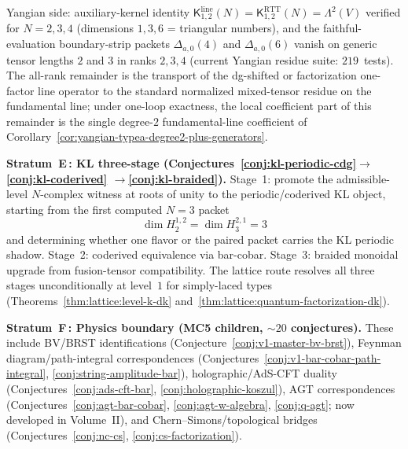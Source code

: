 \begin{remark}
Yangian side: auxiliary-kernel identity
$\mathsf{K}^{\mathrm{line}}_{1,2}(N)
= \mathsf{K}^{\mathrm{RTT}}_{1,2}(N) = \Lambda^2(V)$ verified
for $N = 2, 3, 4$ (dimensions $1, 3, 6$ = triangular numbers), and the
faithful-evaluation boundary-strip packets $\Delta_{a,0}(4)$ and
$\Delta_{a,0}(6)$ vanish on generic tensor lengths $2$ and $3$ in
ranks $2,3,4$ \textup{(}current Yangian residue suite:
$219$~tests\textup{)}. The all-rank remainder is the
transport of the dg-shifted or factorization one-factor line operator
to the standard normalized mixed-tensor residue on the fundamental
line; under one-loop exactness, the local coefficient part of this
remainder is the single degree-$2$ fundamental-line coefficient of
Corollary~\textup{\ref{cor:yangian-typea-degree2-plus-generators}}.

\smallskip\noindent
\textbf{Stratum~E\,: KL three-stage
(Conjectures~\ref{conj:kl-periodic-cdg}$\to$\ref{conj:kl-coderived}%
$\to$\ref{conj:kl-braided}).}
Stage~1: promote the admissible-level $N$-complex witness at roots
of unity to the periodic/coderived KL object, starting from the first
computed $N=3$ packet
\[
\dim H^{1,2}_2
=
\dim H^{2,1}_3
=
3
\]
and determining whether one flavor or the paired packet carries the KL
periodic shadow.
Stage~2: coderived equivalence via bar-cobar.
Stage~3: braided monoidal upgrade from fusion-tensor compatibility.
The lattice route resolves all three stages unconditionally at
level~$1$ for simply-laced types
\textup{(}Theorems~\ref{thm:lattice:level-k-dk}
and~\ref{thm:lattice:quantum-factorization-dk}\textup{)}.

\smallskip\noindent
\textbf{Stratum~F\,: Physics boundary \textup{(}MC5 children, ${\sim}20$
conjectures\textup{)}.}
These include BV/BRST identifications
\textup{(}Conjecture~\ref{conj:v1-master-bv-brst}\textup{)},
Feynman diagram/path-integral correspondences
\textup{(}Conjectures~\ref{conj:v1-bar-cobar-path-integral},
\ref{conj:string-amplitude-bar}\textup{)},
holographic/AdS-CFT duality
\textup{(}Conjectures~\ref{conj:ads-cft-bar},
\ref{conj:holographic-koszul}\textup{)},
AGT correspondences
\textup{(}Conjectures~\ref{conj:agt-bar-cobar},
\ref{conj:agt-w-algebra}, \ref{conj:q-agt};
now developed in Volume~II\textup{)},
and Chern--Simons/topological bridges
\textup{(}Conjectures~\ref{conj:nc-cs},
\ref{conj:cs-factorization}\textup{)}.


\end{remark}
